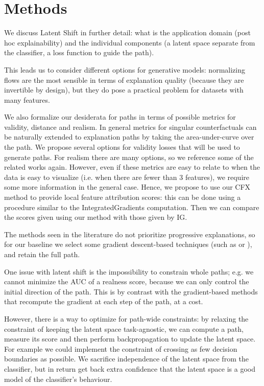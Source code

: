\documentclass[../main.tex]{subfiles}
\begin{document}
\section{Methods}

We discuss Latent Shift in further detail: what is the application domain (post hoc explainability) and the individual components (a latent space separate from the classifier, a loss function to guide the path).

This leads us to consider different options for generative models: normalizing flows are the most sensible in terms of explanation quality (because they are invertible by design), but they do pose a practical problem for datasets with many features.

We also formalize our desiderata for paths in terms of possible metrics for validity, distance and realism. In general metrics for singular counterfactuals can be naturally extended to explanation paths by taking the area-under-curve over the path.
We propose several options for validity losses that will be used to generate paths.
For realism there are many options, so we reference some of the related works again.
However, even if these metrics are easy to relate to when the data is easy to visualize (i.e. when there are fewer than 3 features), we require some more information in the general case. Hence, we propose to use our CFX method to provide local feature attribution scores: this can be done using a procedure similar to the IntegratedGradients computation. Then we can compare the scores given using our method with those given by IG.

The methods seen in the literature do not prioritize progressive explanations, so for our baseline we select some gradient descent-based techniques (such as \cite{joshiRealistic2019} or \cite{wachterCounterfactual2017}), and retain the full path.

One issue with latent shift is the impossibility to constrain whole paths; e.g. we cannot minimize the AUC of a realness score, because we can only control the initial direction of the path. This is by contrast with the gradient-based methods that recompute the gradient at each step of the path, at a cost. 

However, there is a way to optimize for path-wide constraints:
by relaxing the constraint of keeping the latent space task-agnostic, we can compute a path, measure its score and then perform backpropagation to update the latent space. 
For example we could implement the constraint of crossing as few decision boundaries as possible.
We sacrifice independence of the latent space from the classifier, but in return get back extra confidence that the latent space is a good model of the classifier's behaviour.
\end{document}
